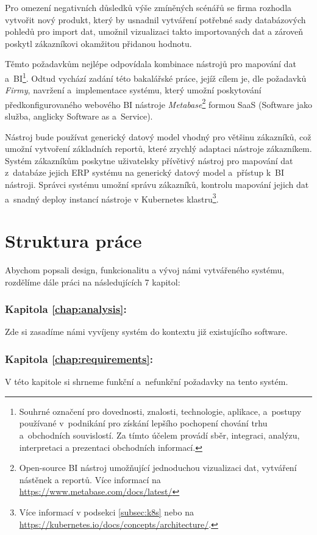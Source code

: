 Pro omezení negativních důsledků výše zmíněných scénářů se firma rozhodla vytvořit nový produkt, který by usnadnil vytváření potřebné sady databázových pohledů pro import dat, umožnil vizualizaci takto importovaných dat a zároveň poskytl zákazníkovi okamžitou přidanou hodnotu.

Těmto požadavkům nejlépe odpovídala kombinace nástrojů pro mapování dat a~BI\footnote{
Souhrné označení pro dovednosti, znalosti, technologie, aplikace, a~postupy používané v~podnikání pro získání lepšího pochopení chování trhu a~obchodních souvislostí.
Za tímto účelem provádí sběr, integraci, analýzu, interpretaci a prezentaci obchodních informací.
}.
Odtud vychází zadání této bakalářské práce, jejíž cílem je, dle požadavků \textit{Firmy}, navržení a~implementace systému, který umožní poskytování předkonfigurovaného webového BI nástroje \textit{Metabase}\footnote{
Open-source BI nástroj umožňující jednoduchou vizualizaci dat, vytváření nástěnek a reportů. Více informací na \url{https://www.metabase.com/docs/latest/}
} 
formou SaaS (Software jako služba, anglicky Software as a~Service). 

Nástroj bude používat generický datový model vhodný pro většinu zákazníků, což umožní vytvoření základních reportů, které zrychlý adaptaci nástroje zákazníkem. Systém zákazníkům poskytne uživatelsky přívětivý nástroj pro mapování dat z~databáze jejich ERP systému na generický datový model a~přístup k~BI nástroji.
Správci systému umožní správu zákazníků, kontrolu mapování jejich dat a~snadný deploy instancí nástroje v Kubernetes klastru\footnote{Více informací v podsekci \ref{subsec:k8s} nebo na \url{https://kubernetes.io/docs/concepts/architecture/}.}. 

\section{Struktura práce}

Abychom popsali design, funkcionalitu a vývoj námi vytvářeného systému, rozdělíme dále práci na následujících 7 kapitol:

\subsubsection{Kapitola \ref{chap:analysis}: }
Zde si zasadíme námi vyvíjeny systém do kontextu již existujícího software.

\subsubsection{Kapitola \ref{chap:requirements}: }
V této kapitole si shrneme funkční a~nefunkční požadavky na tento systém.

